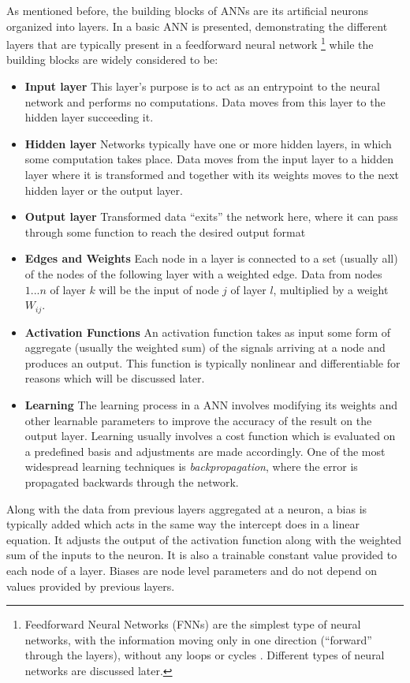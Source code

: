     As mentioned before, the building blocks of ANNs are its artificial
    neurons organized into layers. In   a basic
    ANN is presented, demonstrating the different layers that are typically
    present in a feedforward neural network \footnote{Feedforward Neural Networks
    (FNNs) are the simplest type of neural networks, with the information moving
    only in one direction (``forward'' through the layers), without any loops or
    cycles \cite{article:SCHMID}. Different types of neural networks are discussed
    later.} while the building blocks are widely considered \cite{article:SCHMID} to
    be:
    \begin{itemize}
    \item \textbf{Input layer} This layer's purpose is to act as an
    entrypoint to the neural network and performs no computations. Data moves from
    this layer to the hidden layer succeeding it.
    \item \textbf{Hidden layer} Networks typically have one or more
    hidden layers, in which some computation takes place. Data moves from the input
    layer to a hidden layer where it is transformed and together with its weights
    moves to the next hidden layer or the output layer.
    \item \textbf{Output layer} Transformed data ``exits'' the network here,
    where it can pass through some function to reach the desired output
    format
    \item \textbf{Edges and Weights} Each node in a layer is connected
    to a set (usually all) of the nodes of the following layer with a
    weighted edge. Data from nodes $1 ... n$ of layer $k$ will be the input
    of node $j$ of layer $l$, multiplied by a weight $W_{ij}$. 
    \item \textbf{Activation Functions} An activation function takes as
    input some form of aggregate (usually the weighted sum) of the signals
  arriving at a node and produces an output. This function is typically
  nonlinear and differentiable for reasons which will be discussed later.
\item \textbf{Learning} The learning process in a ANN involves modifying
  its weights and other learnable parameters to improve the accuracy
  of the result on the output layer. Learning usually involves a cost
  function which is evaluated on a predefined basis and adjustments are
  made accordingly. One of the most widespread learning techniques is
  \textit{backpropagation}, where the error is propagated backwards
  through the network.
  
\end{itemize}
Along with the data from previous layers aggregated at a neuron, a bias
is typically added which acts in the same way the intercept does in a
linear equation. It adjusts the output of the activation function along
with the weighted sum of the inputs to the neuron. It is also a trainable
constant value provided to each node of a layer. Biases are node level
parameters and do not depend on values provided by previous layers.



